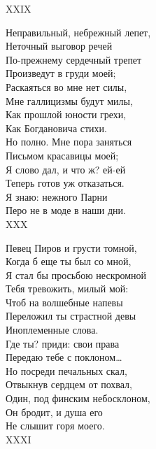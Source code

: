 {XXIX

Неправильный, небрежный лепет,\\
Неточный выговор речей\\
По-прежнему сердечный трепет\\
Произведут в груди моей;\\
Раскаяться во мне нет силы,\\
Мне галлицизмы будут милы,\\
Как прошлой юности грехи,\\
Как Богдановича стихи.\\
Но полно. Мне пора заняться\\
Письмом красавицы моей;\\
Я слово дал, и что ж? ей-ей\\
Теперь готов уж отказаться.\\
Я знаю: нежного Парни\\
Перо не в моде в наши дни.\\

XXX

Певец Пиров и грусти томной,\\
Когда б еще ты был со мной,\\
Я стал бы просьбою нескромной\\
Тебя тревожить, милый мой:\\
Чтоб на волшебные напевы\\
Переложил ты страстной девы\\
Иноплеменные слова.\\
Где ты? приди: свои права\\
Передаю тебе с поклоном…\\
Но посреди печальных скал,\\
Отвыкнув сердцем от похвал,\\
Один, под финским небосклоном,\\
Он бродит, и душа его\\
Не слышит горя моего.\\

XXXI

}
